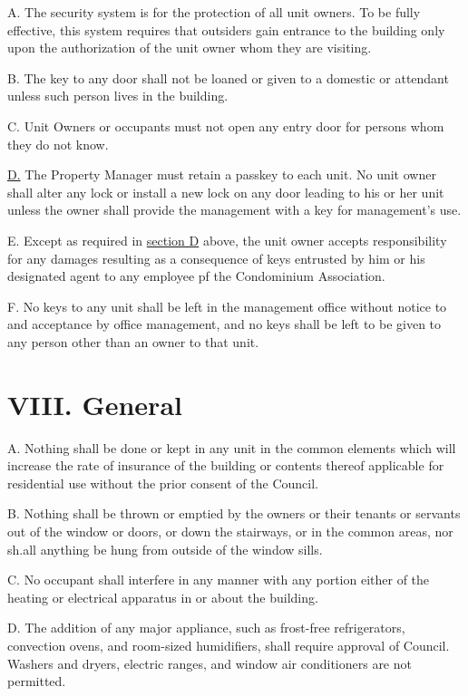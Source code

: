 \documentclass[
  14pt,
]{book}
\begin{document}
A. The security system is for the protection of all unit owners. To be fully effective, this system requires that outsiders gain entrance to the building only upon the authorization of the unit owner whom they are visiting.

B. The key to any door shall not be loaned or given to a domestic or attendant unless such person lives in the building.

C. Unit Owners or occupants must not open any entry door for persons whom they do not know.

\protect\hyperlink{Sect4D}{D.} The Property Manager must retain a passkey to each unit. No unit owner shall alter any lock or install a new lock on any door leading to his or her unit unless the owner shall provide the management with a key for management's use.

E. Except as required in \protect\hyperlink{Sect4D}{section D} above, the unit owner accepts responsibility for any damages resulting as a consequence of keys entrusted by him or his designated agent to any employee pf the Condominium Association.

F. No keys to any unit shall be left in the management office without notice to and acceptance by office management, and no keys shall be left to be given to any person other than an owner to that unit.

\hypertarget{viii.-general}{%
\section*{VIII. General}\label{viii.-general}}

A. Nothing shall be done or kept in any unit in the common elements which will increase the rate of insurance of the building or contents thereof applicable for residential use without the prior consent of the Council.

B. Nothing shall be thrown or emptied by the owners or their tenants or servants out of the window or doors, or down the stairways, or in the common areas, nor sh.all anything be hung from outside of the window sills.

C. No occupant shall interfere in any manner with any portion either of the heating or electrical apparatus in or about the building.

D. The addition of any major appliance, such as frost-free refrigerators, convection ovens, and room-sized humidifiers, shall require approval of Council. Washers and dryers, electric ranges, and window air conditioners are not permitted.
\end{document}
